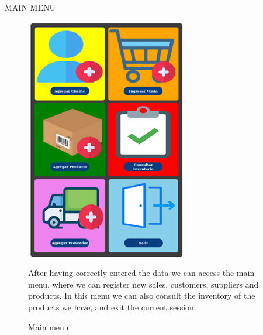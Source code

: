 \documentclass{article}
\begin{document}
\begin{center}
MAIN MENU
\end{center}
\begin{figure}[ht]
\begin{minipage}[t]{0.5\linewidth}
\caption {Main menu}
\centering
\includegraphics[scale=1]{fig4}
\end{minipage}
\begin{minipage}[t]{0.5\linewidth}
\bigskip
\bigskip
\bigskip
\bigskip
\bigskip
\bigskip
\bigskip
\bigskip
After having correctly entered the data we can access the main menu, where we can register new sales, customers, suppliers and products. In this menu we can also consult the inventory of the products we have, and exit the current session.
\end{minipage}
\end{figure}

\pagebreak
\end{document}
